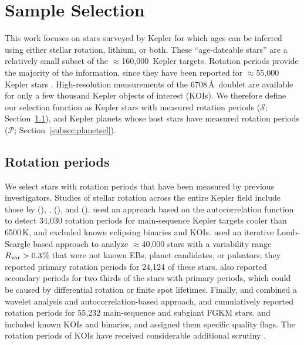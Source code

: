 \documentclass[11pt,twocolumn,tighten]{aastex63}
\newcommand{\nkeplerstars}{$\approx$160{,}000}
\begin{document}
\section{Sample Selection}
\label{sec:selection}

This work focuses on stars surveyed by Kepler for which ages can be
inferred using either stellar rotation, lithium, or both.  These
``age-dateable stars'' are a relatively small subset of the
\nkeplerstars\ Kepler targets.  Rotation periods provide the majority
of the information, since they have been reported for
$\approx$55{,}000 Kepler stars
\citep[e.g.][]{McQuillan_2014,Santos_2021}.  
High-resolution measurements of the  6708\,\AA\ doublet are
available for only a few thousand Kepler objects of interest (KOIs).
We therefore define our selection function as Kepler stars
with measured rotation periods ($\mathcal{S}$;
Section~\ref{subsec:starsel}), and Kepler planets whose host stars
have measured rotation periods ($\mathcal{P}$;
Section~\ref{subsec:planetsel}).


\subsection{Rotation periods}
\label{subsec:starsel}

We select stars with rotation periods that have been measured by
previous investigators.  Studies of stellar rotation across the entire
Kepler field include those by \citet{McQuillan_2014}
(), \citet{Reinhold_2015},
\citet{Santos_2019} (), and
\citet{Santos_2021} ().
 used an approach based on the
autocorrelation function to detect 34{,}030 rotation periods for
main-sequence Kepler targets cooler than 6500\,K, and excluded known
eclipsing binaries and KOIs.  \citet{Reinhold_2015} used an iterative
Lomb-Scargle based approach to analyze $\approx$40{,}000 stars with a
variability range $R_{\rm var}>0.3$\% that were not known EBs, planet
candidates, or pulsators; they reported primary rotation periods for
24{,}124 of these stars.  \citet{Reinhold_2015} also reported
secondary periods for two thirds of the stars with primary periods,
which could be caused by differential rotation or finite spot
lifetimes.  Finally,  and
 combined a wavelet analysis and
autocorrelation-based approach, and cumulatively reported rotation
periods for 55{,}232 main-sequence and subgiant FGKM stars.
 and  included known
KOIs and binaries, and assigned them specific quality flags.  The
rotation periods of KOIs have received considerable additional
scrutiny
\citep[e.g.][]{Walkowicz_2013,Mazeh_2015,Angus_2018,David_2021}.
\end{document}
